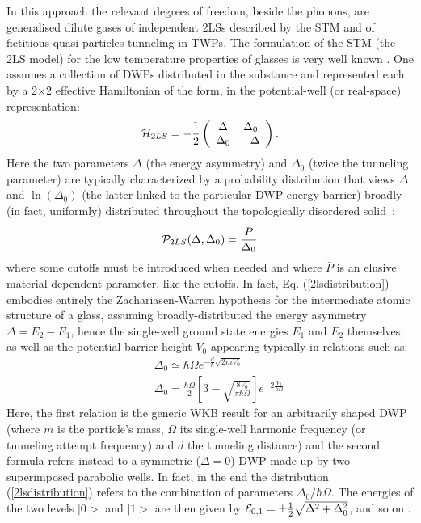 \documentclass[10pt]{article}
\begin{document}
In this approach \cite{Jug2004} the relevant degrees of freedom, beside the 
phonons, are generalised dilute gases of independent 2LSs described by the STM 
and of fictitious quasi-particles tunneling in TWPs.
The formulation of the STM (the 2LS model) for the low temperature properties 
of glasses is very well known \cite{Phi1981,Esq1998}. One assumes a collection 
of DWPs distributed in the substance and represented each by a 2$\times$2 
effective Hamiltonian of the form, in the potential-well (or real-space) representation:
\begin{equation}
{\cal H}_{2LS}=-\frac{1}{2}\left( \begin{array}{cc}
\Delta & \Delta_0 \cr
\Delta_0 & -\Delta \end{array} \right).
\label{2lstunneling}
\end{equation}
Here the two parameters $\Delta$ (the energy asymmetry) and $\Delta_0$ 
(twice the tunneling parameter) are typically characterized by a probability
distribution that views $\Delta$ and $\ln(\Delta_0)$ (the latter linked to
the particular DWP energy barrier) broadly (in fact, uniformly) distributed 
throughout the topologically disordered solid~\cite{Phi1987}:
\begin{equation}
{\cal P}_{2LS}(\Delta,\Delta_0)=\frac{\bar{P}}{\Delta_0}
\label{2lsdistribution}
\end{equation}
where some cutoffs must be introduced when needed and where $\bar{P}$ is 
an elusive material-dependent parameter, like the cutoffs. In fact, Eq. 
(\ref{2lsdistribution}) embodies entirely the Zachariasen-Warren hypothesis for 
the intermediate atomic structure of a glass, assuming broadly-distributed the
energy asymmetry $\Delta=E_2-E_1$, hence the single-well ground state 
energies $E_1$ and $E_2$ themselves, as well as the potential barrier height 
$V_0$ appearing typically in relations such as:
\begin{eqnarray}
&&\Delta_0\simeq\hbar\Omega e^{-\frac{d}{\hbar}\sqrt{2mV_0}} \\
&& \Delta_0=\frac{\hbar\Omega}{2} \left[3-\sqrt{\frac{8V_0}{\pi\hbar\Omega}}
\right]e^{-2\frac{V_0}{\hbar\Omega}} \label{overlap}
\end{eqnarray}   
Here, the first relation is the generic WKB result for an arbitrarily shaped DWP 
(where $m$ is the particle's mass, $\Omega$ its single-well harmonic frequency 
(or tunneling attempt frequency) and $d$ the tunneling distance) and the second 
formula refers instead to a symmetric ($\Delta=0$) DWP made up by two 
superimposed parabolic wells. In fact, in the end the distribution (\ref{2lsdistribution})
refers to the combination of parameters $\Delta_0/\hbar\Omega$. The
energies of the two levels $|0>$ and $|1>$ are then given by 
${\cal E}_{0,1}=\pm\frac{1}{2}\sqrt{\Delta^2+\Delta_0^2}$, and so on 
\cite{Phi1981,Phi1987}.
\end{document}
